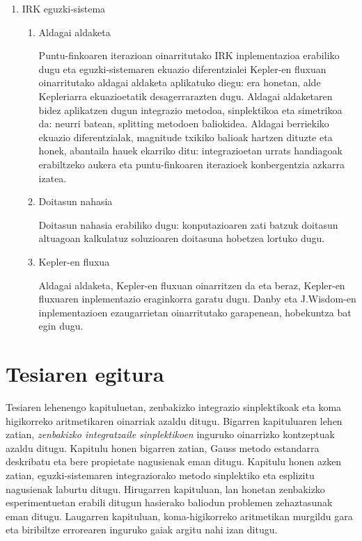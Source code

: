 \begin{enumerate}
\item IRK eguzki-sistema

\begin{enumerate}
\item Aldagai aldaketa

Puntu-finkoaren iterazioan oinarritutako IRK inplementazioa erabiliko dugu eta eguzki-sistemaren ekuazio diferentzialei Kepler-en fluxuan oinarritutako aldagai aldaketa aplikatuko diegu: era honetan, alde Kepleriarra ekuazioetatik desagerrarazten dugu.
Aldagai aldaketaren bidez aplikatzen dugun integrazio metodoa, sinplektikoa eta simetrikoa da: neurri batean, splitting metodoen baliokidea. Aldagai berriekiko ekuazio diferentzialak, magnitude txikiko balioak hartzen dituzte eta honek, abantaila hauek ekarriko ditu: integrazioetan urrats handiagoak erabiltzeko aukera eta puntu-finkoaren iterazioek konbergentzia azkarra izatea.

\item Doitasun nahasia

Doitasun nahasia erabiliko dugu: konputazioaren zati batzuk doitasun altuagoan kalkulatuz soluzioaren doitasuna hobetzea lortuko dugu.    

\item Kepler-en fluxua

Aldagai aldaketa, Kepler-en fluxuan oinarritzen da eta beraz, Kepler-en fluxuaren inplementazio eraginkorra garatu dugu. Danby \cite{Danby1992} eta J.Wisdom-en \cite{Wisdom2015} inplementazioen ezaugarrietan oinarritutako garapenean, hobekuntza bat egin dugu.  
\end{enumerate}







\end{enumerate}        


\section{Tesiaren egitura}

Tesiaren lehenengo  kapituluetan, zenbakizko integrazio sinplektikoak eta koma higikorreko aritmetikaren oinarriak azaldu ditugu. Bigarren kapituluaren lehen zatian, \emph{zenbakizko integratzaile sinplektikoen} inguruko oinarrizko kontzeptuak azaldu ditugu. Kapitulu honen bigarren zatian, Gauss metodo estandarra deskribatu eta bere propietate nagusienak eman ditugu. Kapitulu honen azken zatian, eguzki-sistemaren integraziorako metodo sinplektiko eta esplizitu nagusienak laburtu ditugu. Hirugarren kapituluan, lan honetan zenbakizko esperimentuetan erabili ditugun hasierako baliodun problemen zehaztasunak eman ditugu. Laugarren kapituluan, koma-higikorreko aritmetikan murgildu gara eta biribiltze errorearen inguruko gaiak argitu nahi izan ditugu.

